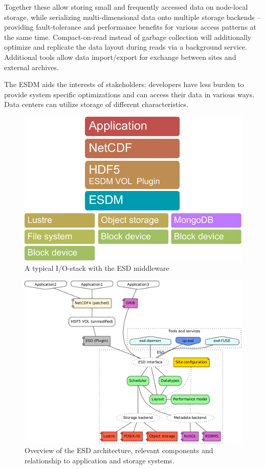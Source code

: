 Together these allow storing small and frequently accessed data on node-local storage, while serializing multi-dimensional data onto multiple storage backends -- providing fault-tolerance and performance benefits for various access patterns at the same time.
Compact-on-read instead of garbage collection will additionally optimize and replicate the data layout during reads via a background service.
Additional tools allow data import/export for exchange between sites and external archives.

The ESDM aids the interests of stakeholders: developers have less burden to provide system specific optimizations and can access their data in various ways.
Data centers can utilize storage of different characteristics.

\bigskip


\begin{figure}[bp]
	\centering
	\includegraphics[width=0.5\columnwidth]{figures/layers-esdm}
	\caption{A typical I/O-stack with the ESD middleware}
	\label{fig:architecture-esd-layering}
\end{figure}

\begin{figure}[bp]
	\centering
	\includegraphics[width=0.98\columnwidth]{figures/architecture-backend-src.pdf}
	\caption{Overview of the ESD architecture, relevant components and relationship to application and storage systems.}
	\label{fig:architecture}
\end{figure}

